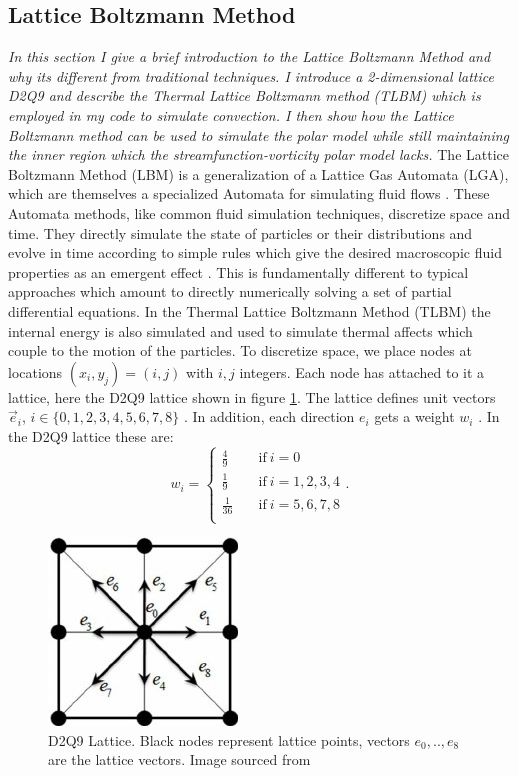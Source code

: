 \documentclass{article}
\begin{document}
\subsection*{Lattice Boltzmann Method}
{\it{In this section I give a brief introduction to the Lattice Boltzmann Method and why its different from traditional techniques. I introduce a 2-dimensional lattice D2Q9 and describe the Thermal Lattice Boltzmann method (TLBM) which is employed in my code to simulate convection. I then show how the Lattice Boltzmann method can be used to simulate the polar model while still maintaining the inner region which the streamfunction-vorticity polar model lacks.}}
\vspace{0.3cm}
\newline
\noindent The Lattice Boltzmann Method (LBM) is a generalization of a Lattice Gas Automata (LGA), which are themselves a 
specialized Automata for simulating fluid flows \cite{rothman2004lattice}. These Automata methods, like common fluid simulation techniques, 
discretize space and time. They directly simulate the state of particles or their distributions and evolve in time 
according to simple rules which give the desired macroscopic fluid properties as an emergent effect \cite{wagner2008practical}. This is fundamentally 
different to typical approaches which amount to directly numerically solving a set of partial differential equations. In the Thermal Lattice Boltzmann Method (TLBM) the internal energy is also simulated and used to simulate thermal affects which couple to the motion of the particles.
\newline
\noindent To discretize space, we place nodes at locations $(x_i,y_j)=(i,j)$ with $i,j$ integers. Each node has attached to it a lattice, here the D2Q9 lattice shown in figure \ref{D2Q9}. The lattice defines unit vectors $\vec{e}_i$, $i \in \{ 0,1,2,3,4,5,6,7,8 \}$ \cite{mora2017simulation}. In addition, each direction $e_i$ gets a weight $w_i$ \cite{mora2017simulation}. In the D2Q9 lattice these are:
\begin{equation*}
w_i = \begin{cases}
          \frac{4}{9} \quad &\text{if}  \ i=0 \\
          \frac{1}{9} \quad &\text{if} \ i=1,2,3,4 \\
          \frac{1}{36} \quad &\text{if} \ i=5,6,7,8 \\
     \end{cases}.
\end{equation*}
\begin{figure}[H]
	\centering
	\includegraphics{D2Q9Lattice.jpg}
	\caption{D2Q9 Lattice. Black nodes represent lattice points, vectors $e_0,..,e_8$ are the lattice vectors. Image sourced from \cite{khazaeli2015ghost}}
	\label{D2Q9}
\end{figure}
\end{document}
